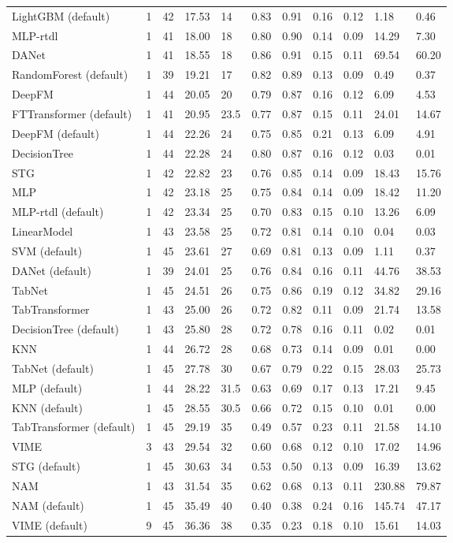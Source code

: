 \begin{tabular}{lllllllllll}
LightGBM (default) & 1 & 42 & 17.53 & 14 & 0.83 & 0.91 & 0.16 & 0.12 & 1.18 & 0.46 \\
MLP-rtdl & 1 & 41 & 18.00 & 18 & 0.80 & 0.90 & 0.14 & 0.09 & 14.29 & 7.30 \\
DANet & 1 & 41 & 18.55 & 18 & 0.86 & 0.91 & 0.15 & 0.11 & 69.54 & 60.20 \\
RandomForest (default) & 1 & 39 & 19.21 & 17 & 0.82 & 0.89 & 0.13 & 0.09 & 0.49 & 0.37 \\
DeepFM & 1 & 44 & 20.05 & 20 & 0.79 & 0.87 & 0.16 & 0.12 & 6.09 & 4.53 \\
FTTransformer (default) & 1 & 41 & 20.95 & 23.5 & 0.77 & 0.87 & 0.15 & 0.11 & 24.01 & 14.67 \\
DeepFM (default) & 1 & 44 & 22.26 & 24 & 0.75 & 0.85 & 0.21 & 0.13 & 6.09 & 4.91 \\
DecisionTree & 1 & 44 & 22.28 & 24 & 0.80 & 0.87 & 0.16 & 0.12 & 0.03 & 0.01 \\
STG & 1 & 42 & 22.82 & 23 & 0.76 & 0.85 & 0.14 & 0.09 & 18.43 & 15.76 \\
MLP & 1 & 42 & 23.18 & 25 & 0.75 & 0.84 & 0.14 & 0.09 & 18.42 & 11.20 \\
MLP-rtdl (default) & 1 & 42 & 23.34 & 25 & 0.70 & 0.83 & 0.15 & 0.10 & 13.26 & 6.09 \\
LinearModel & 1 & 43 & 23.58 & 25 & 0.72 & 0.81 & 0.14 & 0.10 & 0.04 & 0.03 \\
SVM (default) & 1 & 45 & 23.61 & 27 & 0.69 & 0.81 & 0.13 & 0.09 & 1.11 & 0.37 \\
DANet (default) & 1 & 39 & 24.01 & 25 & 0.76 & 0.84 & 0.16 & 0.11 & 44.76 & 38.53 \\
TabNet & 1 & 45 & 24.51 & 26 & 0.75 & 0.86 & 0.19 & 0.12 & 34.82 & 29.16 \\
TabTransformer & 1 & 43 & 25.00 & 26 & 0.72 & 0.82 & 0.11 & 0.09 & 21.74 & 13.58 \\
DecisionTree (default) & 1 & 43 & 25.80 & 28 & 0.72 & 0.78 & 0.16 & 0.11 & 0.02 & 0.01 \\
KNN & 1 & 44 & 26.72 & 28 & 0.68 & 0.73 & 0.14 & 0.09 & 0.01 & 0.00 \\
TabNet (default) & 1 & 45 & 27.78 & 30 & 0.67 & 0.79 & 0.22 & 0.15 & 28.03 & 25.73 \\
MLP (default) & 1 & 44 & 28.22 & 31.5 & 0.63 & 0.69 & 0.17 & 0.13 & 17.21 & 9.45 \\
KNN (default) & 1 & 45 & 28.55 & 30.5 & 0.66 & 0.72 & 0.15 & 0.10 & 0.01 & 0.00 \\
TabTransformer (default) & 1 & 45 & 29.19 & 35 & 0.49 & 0.57 & 0.23 & 0.11 & 21.58 & 14.10 \\
VIME & 3 & 43 & 29.54 & 32 & 0.60 & 0.68 & 0.12 & 0.10 & 17.02 & 14.96 \\
STG (default) & 1 & 45 & 30.63 & 34 & 0.53 & 0.50 & 0.13 & 0.09 & 16.39 & 13.62 \\
NAM & 1 & 43 & 31.54 & 35 & 0.62 & 0.68 & 0.13 & 0.11 & 230.88 & 79.87 \\
NAM (default) & 1 & 45 & 35.49 & 40 & 0.40 & 0.38 & 0.24 & 0.16 & 145.74 & 47.17 \\
VIME (default) & 9 & 45 & 36.36 & 38 & 0.35 & 0.23 & 0.18 & 0.10 & 15.61 & 14.03 \\
\bottomrule
\end{tabular}
